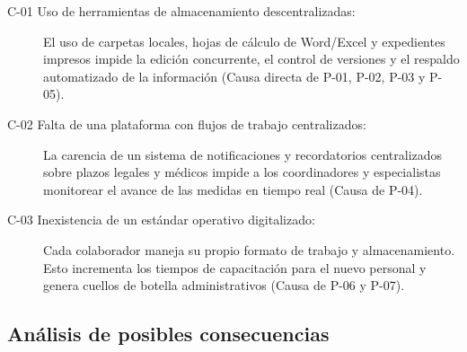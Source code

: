 \begin{description}
	\item[C-01 Uso de herramientas de almacenamiento descentralizadas:] El uso de carpetas locales, hojas de cálculo de Word/Excel y expedientes impresos impide la edición concurrente, el control de versiones y el respaldo automatizado de la información (Causa directa de P-01, P-02, P-03 y P-05).
	\item[C-02 Falta de una plataforma con flujos de trabajo centralizados:] La carencia de un sistema de notificaciones y recordatorios centralizados sobre plazos legales y médicos impide a los coordinadores y especialistas monitorear el avance de las medidas en tiempo real (Causa de P-04).
	\item[C-03 Inexistencia de un estándar operativo digitalizado:] Cada colaborador maneja su propio formato de trabajo y almacenamiento. Esto incrementa los tiempos de capacitación para el nuevo personal y genera cuellos de botella administrativos (Causa de P-06 y P-07).
\end{description}

\subsection{Análisis de posibles consecuencias}

